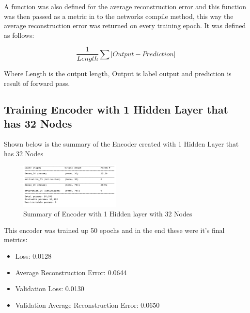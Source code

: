 \documentclass[conference]{IEEEtran}
\begin{document}
    A function was also defined for the average reconstruction error and this function was then 
    passed as a metric in to the networks compile method, this way the average reconstruction error
    was returned on every training epoch. It was defined as follows:

    \begin{equation}
        \frac{1}{Length} \sum |Output - Prediction|
    \end{equation}

    Where Length is the output length, Output is label output and prediction is result of forward pass.
    
    \subsection{Training Encoder with 1 Hidden Layer that has 32 Nodes}

    Shown below is the summary of the Encoder created with 1 Hidden Layer that has 32 Nodes

    \begin{figure}[H]
        \centering
        \captionsetup{justification=centering}
        \centering
            \includegraphics[width=0.45\textwidth]{Encoder_1_32.png}
            \caption{Summary of Encoder with 1 Hidden layer with 32 Nodes}
    \end{figure}

    This encoder was trained up 50 epochs and in the end these were it's final metrics:

    \begin{itemize}
        \item Loss: 0.0128
        \item Average Reconstruction Error: 0.0644
        \item Validation Loss: 0.0130
        \item Validation Average Reconstruction Error: 0.0650
    \end{itemize}
\end{document}
